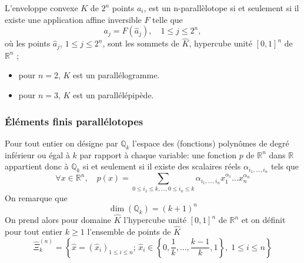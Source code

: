 \documentclass{beamer}
\begin{document}
\begin{frame}
 
L'enveloppe convexe $K$ de $2^n$ points $a_i$, est un n-parallèlotope si et seulement si il existe une application affine inversible $F$ %
 telle que
\begin{equation}
a_j=F(\hat{a}_j),\quad 1\leq j\leq 2^n,
\end{equation}
où les points $\hat{a}_j$,  $1\leq j\leq 2^n$,  sont les sommets de $\widehat{K}$, hypercube unité $[0, 1]^n$ de $\mathbb{R}^n$ ;
\begin{itemize}
\item pour $n=2$, $K$ est un parallélogramme.
\item pour $n=3$, $K$ est un parallélépipède.
\end{itemize}


\end{frame}
\begin{frame}
\frametitle{Éléments finis parallélotopes}
Pour tout entier on désigne par $\mathbb{Q}_k$ l'espace des (fonctions) polynômes de degré inférieur ou égal à $k$ par rapport à chaque variable: une fonction $p$ de $\mathbb{R}^n$ dans $\mathbb{R}$ appartient donc à $\mathbb{Q}_k$  si et seulement si il existe des scalaires réels $\alpha_{i_1,...,i_n}$ tels que
\begin{equation}
\forall x\in \mathbb{R}^n,\quad p(x)=\sum_{0\leq i_1\leq k,...,0\leq i_n\leq k}\alpha_{i_1,...,i_n}x_1^{\alpha_1}...x_n^{\alpha_n}
\end{equation}
On remarque que
\[\dim (\mathbb{Q}_k) = (k+ 1)^n\]
   On prend alors pour domaine $\widehat{K}$ l'hypercube unité $[0, 1]^n$ de $\mathbb{R}^n$ et on définit pour tout entier $k \geq 1$ l'ensemble de points de $\widehat{K}$
\begin{equation}
\widehat{\Xi}_k^{(n)}=\left\{\hat{x}=(\hat{x}_i)_{1\leq i\leq n};\, \hat{x}_i\in\left\{0,\frac 1k,...,\frac{k-1}{k},1\right\},\; 1\leq i\leq n\right\}
\end{equation}
\end{frame}
\end{document}

